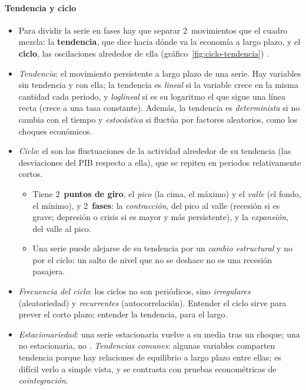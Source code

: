 \documentclass[11pt]{article}
\begin{document}
\paragraph{Tendencia y ciclo}
\begin{itemize}
\item Para dividir la serie en fases hay que separar 2~movimientos que el cuadro mezcla: la \textbf{tendencia}, que dice hacia dónde va la economía a largo plazo, y el \textbf{ciclo}, las oscilaciones alrededor de ella (gráfico~\ref{fig:ciclo-tendencia}) .
\item \emph{Tendencia}: el movimiento persistente a largo plazo de una serie. Hay variables sin tendencia y con ella; la tendencia es \emph{lineal} si la variable crece en la misma cantidad cada periodo, y \emph{loglineal} si es su logaritmo el que sigue una línea recta (crece a una tasa constante). Además, la tendencia es \emph{determinista} si no cambia con el tiempo y \emph{estocástica} si fluctúa por factores aleatorios, como los choques económicos.
\item \emph{Ciclo}: el  son las fluctuaciones de la actividad alrededor de su tendencia (las desviaciones del PIB respecto a ella), que se repiten en periodos relativamente cortos.
  \begin{itemize}
  \item Tiene 2~\textbf{puntos de giro}, el \emph{pico} (la cima, el máximo) y el \emph{valle} (el fondo, el mínimo), y 2~\textbf{fases}: la \emph{contracción}, del pico al valle (recesión si es grave; depresión o crisis si es mayor y más persistente), y la \emph{expansión}, del valle al pico.
  \item Una serie puede alejarse de su tendencia por un \emph{cambio estructural} y no por el ciclo: un salto de nivel que no se deshace no es una recesión pasajera.
  \end{itemize}
\item \emph{Frecuencia del ciclo}: los ciclos no son periódicos, sino \emph{irregulares} (aleatoriedad) y \emph{recurrentes} (autocorrelación). Entender el ciclo sirve para prever el corto plazo; entender la tendencia, para el largo.
\item \emph{Estacionariedad}: una serie estacionaria vuelve a su media tras un choque; una no estacionaria, no . \emph{Tendencias comunes}: algunas variables comparten tendencia porque hay relaciones de equilibrio a largo plazo entre ellas; es difícil verlo a simple vista, y se contrasta con pruebas econométricas de \emph{cointegración}.
\end{itemize}
\end{document}
